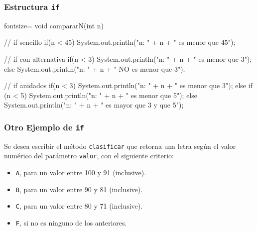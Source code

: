 \documentclass{beamer}
\newcommand{\code}[1]{\texttt{#1}}
\begin{document}
\begin{frame}[fragile]
  \frametitle{Estructura \code{if}}
  \begin{jsmall*}{fontsize=\scriptsize}
    void compararN(int n) {
      // if sencillo
      if(n < 45) {
        System.out.println("n: " + n + " es menor que 45");
      }

      // if con alternativa
      if(n < 3) {
        System.out.println("n: " + n + " es menor que 3");
      } else {
        System.out.println("n: " + n + " NO es menor que 3");
      }

      // if anidados
      if(n < 3) {
        System.out.println("n: " + n + " es menor que 3");
      } else if (n < 5) {
        System.out.println("n: " + n + " es menor que 5");
      } else {
        System.out.println("n: " + n + " es mayor que 3 y que 5");
      }
    }
  \end{jsmall*}
\end{frame}      


\begin{frame}
  \frametitle{Otro Ejemplo de \code{if}}

  Se desea escribir el método \code{clasificar} que retorna una
  letra según el valor numérico del parámetro \code{valor}, con el
  siguiente criterio:
  
  \begin{itemize}
  \item \code{A}, para un valor entre 100 y 91 (inclusive).
  \item \code{B}, para un valor entre 90 y 81 (inclusive).
  \item \code{C}, para un valor entre 80 y 71 (inclusive).
  \item \code{F}, si no es ninguno de los anteriores.
  \end{itemize}

\end{frame}
\end{document}
